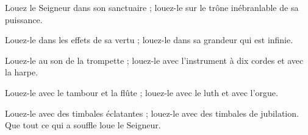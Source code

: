 {Louez le Seigneur dans son sanctuaire ; louez-le sur le trône inébranlable de sa puissance.}

{Louez-le dans les effets de sa vertu ; louez-le dans sa grandeur qui est infinie.}

{Louez-le au son de la trompette ; louez-le avec l’instrument à dix cordes et avec la harpe.}

{Louez-le avec le tambour et la flûte ; louez-le avec le luth et avec l’orgue.}

{Louez-le avec des timbales éclatantes ; louez-le avec des timbales de jubilation. Que tout ce qui a souffle loue le Seigneur.}